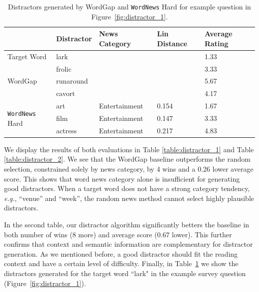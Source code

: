 \begin{table}[ht]
\caption{Distractors generated by WordGap and {\tt WordNews} Hard for example question in Figure~\ref{fig:distractor_1}.} 
\label{table:example_distractors}
\centering
\begin{tabular}{|l|l|l|l|l|}
\hline
                              & {\bf Distractor} & {\bf News Category} & {\bf Lin Distance} & {\bf Average Rating} \\ \hline
Target Word                   & lark       &               &              & 1.33       \\ \hline
\multirow{3}{*}{WordGap}      & frolic     &               &              & 3.33       \\ \cline{2-5} 
                              & runaround  &               &              & 5.67       \\ \cline{2-5} 
                              & cavort     &               &              & 4.17       \\ \hline
\multirow{3}{*}{{\tt WordNews} Hard} & art        & Entertainment & 0.154        & 1.67       \\ \cline{2-5} 
                              & film       & Entertainment & 0.147        & 3.33       \\ \cline{2-5} 
                              & actress    & Entertainment & 0.217        & 4.83       \\ \hline
\end{tabular}
\end{table}

We display the results of both evaluations in Table
\ref{table:distractor_1} and Table \ref{table:distractor_2}.  We see
that the WordGap baseline outperforms the random selection,
constrained solely by news category, by 4 wins and a 0.26 lower
average score.  This shows that word news category alone is
insufficient for generating good distractors.  When a target word does
not have a strong category tendency, {\it e.g.}, ``venue'' and
``week'', the random news method cannot select highly plausible
distractors. 

In the second table, our distractor algorithm significantly betters
the baseline in both number of wins (8 more) and average score ($0.67$
lower).  This further confirms that context and semantic information
are complementary for distractor generation. As we mentioned before, a
good distractor should fit the reading context and have a certain
level of difficulty.
Finally, in Table~\ref{table:example_distractors} we show the distractors generated for the target word “lark" in the example survey question (Figure~\ref{fig:distractor_1}).



